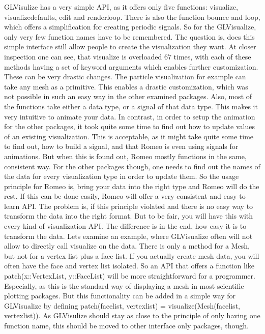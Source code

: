 GLVisulize has a very simple API, as it offers only five functions: visualize, visualizedefaults, edit and renderloop.
There is also the function bounce and loop, which offers a simplification for creating periodic signals.
So for the GLVisualize, only very few function names have to be remembered.
The question is, does this simple interface still allow people to create the visualization they want.
At closer inspection one can see, that visualize is overloaded 67 times, with each of these methods having a set of keyword arguments which enables further customization.
These can be very drastic changes. The particle visualization for example can take any mesh as a primitive. This enables a drastic customization, which was not possible in such an easy way in the other examined packages.
Also, most of the functions take either a data type, or a signal of that data type.
This makes it very intuitive to animate your data. In contrast, in order to setup the animation for the other packages, it took quite some time to find out how to update values of an existing visualization. This is acceptable, as it might take quite some time to find out, how to build a signal, and that Romeo is even using signals for animations.
But when this is found out, Romeo mostly functions in the same, consistent way. For the other packages though, one needs to find out the names of the data for every visualization type in order to update them.
So the usage principle for Romeo is, bring your data into the right type and Romeo will do the rest.
If this can be done easily, Romeo will offer a very consistent and easy to learn API.
The problem is, if this principle violated and there is no easy way to transform the data into the right format.
But to be fair, you will have this with every kind of visualization API. The difference is in the end, how easy it is to transform the data. Lets examine an example, where GLVisualize often will not allow to directly call visualize on the data.
There is only a method for a Mesh, but not for a vertex list plus a face list. If you actually create mesh data, you will often have the face and vertex list isolated. 
So an API that offers a function like patch(x::VertexList, y::FaceList) will be more straightforward for a programmer. Especially, as this is the standard way of displaying a mesh in most scientific plotting packages.
But this functionality can be added in a simple way for GLVisualize by defining patch(facelist, vertexlist) = visualize(Mesh(facelist, vertexlist)).
As GLVisulize should stay as close to the principle of only having one function name, this should be moved to other interface only packages, though. 